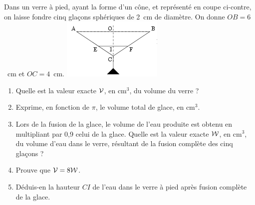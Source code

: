 
 \begin{multicols}{2}
Dans un verre à pied, ayant la forme d'un cône,
et représenté en coupe ci-contre, on laisse fondre cinq glaçons
sphériques de 2~cm de diamètre. On donne $OB=6$~cm et $OC=4$~cm.
\includegraphics[scale=1]{RepS-47.png}
\end{multicols}
\begin{enumerate}
\item Quelle est la valeur exacte $\cal V$, en cm$^3$, du volume du
verre ?
\item Exprime, en fonction de $\pi$, le volume total de glace, en
cm$^3$.
\item Lors de la fusion de la glace, le volume de l'eau produite est
obtenu en multipliant par 0,9 celui de la glace. Quelle est la valeur
exacte $\cal W$, en cm$^3$, du volume d'eau dans le verre, résultant
de la fusion complète des cinq glaçons ?
\item Prouve que ${\cal V}=8{\cal W}$.
\item Déduis-en la hauteur $CI$ de l'eau dans le verre à pied après
fusion complète de la glace.
\end{enumerate}

